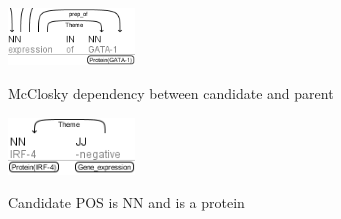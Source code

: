 \documentclass{article} %
\begin{document}
\begin{appendices}
\begin{figure}[H]
  \caption{McClosky dependency between candidate and parent}
  \centering
    \includegraphics[width=0.30\textwidth]{images/arg_7.png}
      \label{fig:mc_dep_candidate_parent}
\end{figure}

\begin{figure}[H]
  \caption{Candidate POS is NN and is a protein}
  \centering
    \includegraphics[width=0.30\textwidth]{images/arg_10.png}
      \label{candidate_nn_protein}
\end{figure}

\end{appendices}

{}

\end{document}
